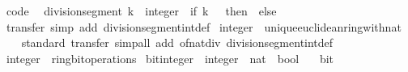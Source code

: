 \begin{isabellebody}
\isanewline
%
\endisadelimproof
\isanewline
{}\isamarkupfalse%
\ {\isacharbrackleft}{\kern0pt}code{\isacharbrackright}{\kern0pt}{\isacharcolon}{\kern0pt}\isanewline
\ \ {\isachardoublequoteopen}division{\isacharunderscore}{\kern0pt}segment\ {\isacharparenleft}{\kern0pt}k\ {\isacharcolon}{\kern0pt}{\isacharcolon}{\kern0pt}\ integer{\isacharparenright}{\kern0pt}\ {\isacharequal}{\kern0pt}\ {\isacharparenleft}{\kern0pt}if\ k\ {\isasymge}\ {}\ then\ {}\ else\ {\isacharminus}{\kern0pt}\ {}{\isacharparenright}{\kern0pt}{\isachardoublequoteclose}\isanewline
%
\isadelimproof
\ \ %
\endisadelimproof
%
\isatagproof
{}\isamarkupfalse%
\ transfer\ {\isacharparenleft}{\kern0pt}simp\ add{\isacharcolon}{\kern0pt}\ division{\isacharunderscore}{\kern0pt}segment{\isacharunderscore}{\kern0pt}int{\isacharunderscore}{\kern0pt}def{\isacharparenright}{\kern0pt}%
\endisatagproof
{\isafoldproof}%
%
\isadelimproof
\isanewline
%
\endisadelimproof
\isanewline
{}\isamarkupfalse%
\ integer\ {\isacharcolon}{\kern0pt}{\isacharcolon}{\kern0pt}\ unique{\isacharunderscore}{\kern0pt}euclidean{\isacharunderscore}{\kern0pt}ring{\isacharunderscore}{\kern0pt}with{\isacharunderscore}{\kern0pt}nat\isanewline
%
\isadelimproof
\ \ %
\endisadelimproof
%
\isatagproof
{}\isamarkupfalse%
\ {\isacharparenleft}{\kern0pt}standard{\isacharsemicolon}{\kern0pt}\ transfer{\isacharparenright}{\kern0pt}\ {\isacharparenleft}{\kern0pt}simp{\isacharunderscore}{\kern0pt}all\ add{\isacharcolon}{\kern0pt}\ of{\isacharunderscore}{\kern0pt}nat{\isacharunderscore}{\kern0pt}div\ division{\isacharunderscore}{\kern0pt}segment{\isacharunderscore}{\kern0pt}int{\isacharunderscore}{\kern0pt}def{\isacharparenright}{\kern0pt}%
\endisatagproof
{\isafoldproof}%
%
\isadelimproof
\isanewline
%
\endisadelimproof
\isanewline
{}\isamarkupfalse%
\ integer\ {\isacharcolon}{\kern0pt}{\isacharcolon}{\kern0pt}\ ring{\isacharunderscore}{\kern0pt}bit{\isacharunderscore}{\kern0pt}operations\isanewline
{}\isanewline
\isanewline
{}\isamarkupfalse%
\ bit{\isacharunderscore}{\kern0pt}integer\ {\isacharcolon}{\kern0pt}{\isacharcolon}{\kern0pt}\ {\isacartoucheopen}integer\ {\isasymRightarrow}\ nat\ {\isasymRightarrow}\ bool{\isacartoucheclose}\isanewline
\ \ \ bit%
\isadelimproof
\ %
\endisadelimproof
%
\isatagproof
\isacommand{{\isachardot}{\kern0pt}}\isamarkupfalse%
%
\endisatagproof
{\isafoldproof}%
%
\isadelimproof
%
\endisadelimproof
\isanewline

\end{isabellebody}
